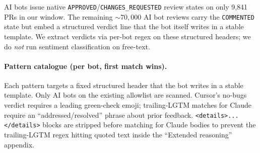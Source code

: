 
AI bots issue native \texttt{APPROVED}/\texttt{CHANGES\_REQUESTED} review states on only 9,841{} PRs in our window. The remaining ${\sim}70{,}000$ AI bot reviews carry the \texttt{COMMENTED} state but embed a structured verdict line that the bot itself writes in a stable template. We extract verdicts via per-bot regex on these structured headers; we do \emph{not} run sentiment classification on free-text.

\paragraph{Pattern catalogue (per bot, first match wins).} Each pattern targets a fixed structured header that the bot writes in a stable template. Only AI bots on the existing allowlist are scanned. Cursor's no-bugs verdict requires a leading green-check emoji; trailing-LGTM matches for Claude require an ``addressed/resolved'' phrase about prior feedback. \texttt{<details>...</details>} blocks are stripped before matching for Claude bodies to prevent the trailing-LGTM regex hitting quoted text inside the ``Extended reasoning'' appendix.

